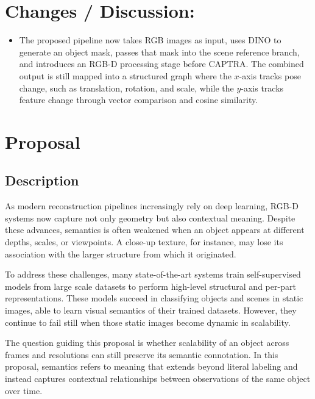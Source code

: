 \documentclass[11pt, oneside]{article}     %
\begin{document}


\newpage

\section{Changes / Discussion:}

\begin{itemize}
    \item The proposed pipeline now takes RGB images as input, uses DINO to generate an object mask, passes that mask into the scene reference branch, and introduces an RGB-D processing stage before CAPTRA. The combined output is still mapped into a structured graph where the $x$-axis tracks pose change, such as translation, rotation, and scale, while the $y$-axis tracks feature change through vector comparison and cosine similarity.
\end{itemize}

\section{Proposal}

\subsection{Description}

As modern reconstruction pipelines increasingly rely on deep learning, RGB-D systems now capture not only geometry but also contextual meaning. Despite these advances, semantics is often weakened when an object appears at different depths, scales, or viewpoints. A close-up texture, for instance, may lose its association with the larger structure from which it originated. 
 
To address these challenges, many state-of-the-art systems train self-supervised models from large scale datasets to perform high-level structural and per-part representations. These models succeed in classifying objects and scenes in static images, able to learn visual semantics of their trained datasets. However, they continue to fail still when those static images become dynamic in scalability.
 
 
The question guiding this proposal is whether scalability of an object across frames and resolutions can still preserve its semantic connotation. In this proposal, semantics refers to meaning that extends beyond literal labeling and instead captures contextual relationships between observations of the same object over time.
\end{document}
